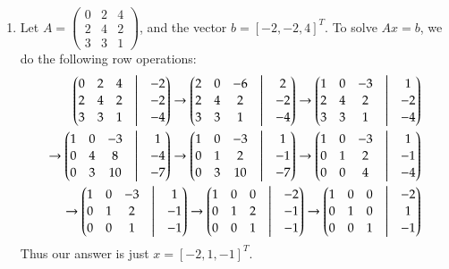 \documentclass[12pt]{article}
\theoremstyle{definitionstyle}
\begin{document}
\begin{enumerate}[leftmargin=\labelsep]
\begin{enumerate}
			\item Let $A = \begin{pmatrix}
				0 & 2 & 4 \\
				2 & 4 & 2 \\
				3 & 3 & 1
			\end{pmatrix}$, and the vector $b = [-2, -2, 4]^T$. 
			To solve $Ax=b$, we do the following row operations:
			\begin{align*}
				\begin{pmatrix}
					0 & 2 & 4 &\bigm| &-2 \\
					2 & 4 & 2 &\bigm| &-2 \\
					3 & 3 & 1 &\bigm| &-4
				\end{pmatrix}\to
				\begin{pmatrix}
					2 & 0 & -6 &\bigm| &2 \\
					2 & 4 & 2 &\bigm| &-2 \\
					3 & 3 & 1 &\bigm| &-4
				\end{pmatrix} \to
				\begin{pmatrix}
					1 & 0 & -3 &\bigm| &1 \\
					2 & 4 & 2 &\bigm| &-2 \\
					3 & 3 & 1 &\bigm| &-4
				\end{pmatrix} \\
				\to
				\begin{pmatrix}
					1 & 0 & -3 &\bigm| &1 \\
					0 & 4 & 8 &\bigm| &-4 \\
					0 & 3 & 10 &\bigm| &-7
				\end{pmatrix} \to
				\begin{pmatrix}
					1 & 0 & -3 &\bigm| &1 \\
					0 & 1 & 2 &\bigm| &-1 \\
					0 & 3 & 10 &\bigm| &-7
				\end{pmatrix} \to
				\begin{pmatrix}
					1 & 0 & -3 &\bigm| &1 \\
					0 & 1 & 2 &\bigm| &-1 \\
					0 & 0 & 4 &\bigm| &-4
				\end{pmatrix} \\
				\to
				\begin{pmatrix}
					1 & 0 & -3 &\bigm| &1 \\
					0 & 1 & 2 &\bigm| &-1 \\
					0 & 0 & 1 &\bigm| &-1
				\end{pmatrix} \to
				\begin{pmatrix}
					1 & 0 & 0 &\bigm| &-2 \\
					0 & 1 & 2 &\bigm| &-1 \\
					0 & 0 & 1 &\bigm| &-1
				\end{pmatrix} \to
				\begin{pmatrix}
					1 & 0 & 0 &\bigm| &-2 \\
					0 & 1 & 0 &\bigm| &1 \\
					0 & 0 & 1 &\bigm| &-1
				\end{pmatrix}
			\end{align*}
			Thus our answer is just $x = [-2, 1, -1]^T$.
			


\end{enumerate}
\end{enumerate}
\end{document}
